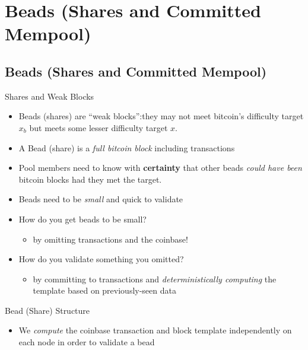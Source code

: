 \documentclass[tikz,mathserif,usenames,dvipsnames,svgnames,table]{beamer}
\newlength{\wideitemsep}
\let\olditem\item
\renewcommand{\item}{\setlength{\itemsep}{\wideitemsep}\olditem}
\begin{document}
\section{Beads (Shares and Committed Mempool)}
\subsection{Beads (Shares and Committed Mempool)}
\begin{frame}{Shares and Weak Blocks}
    \begin{itemize}
        \item Beads (shares) are ``weak blocks'':they may not meet bitcoin's difficulty target $x_b$
            but meets some lesser difficulty target $x$.
        \item A Bead (share) is a {\it full bitcoin block} including transactions
        \item Pool members need to know with {\bf certainty} that other beads {\it could have been}
            bitcoin blocks had they met the target.
        \item Beads need to be {\it small} and quick to validate
        \item How do you get beads to be small?
            \begin{itemize}
                \item[$\Rightarrow$] by omitting transactions and the coinbase!
            \end{itemize}
        \item How do you validate something you omitted?
            \begin{itemize}
                \item[$\Rightarrow$] by committing to transactions and {\it deterministically
                    computing} the template based on previously-seen data
            \end{itemize}
    \end{itemize}
\end{frame}
\begin{frame}{Bead (Share) Structure}



\begin{itemize}
    \item We {\it compute} the coinbase transaction and block template independently on each node
        in order to validate a bead
\end{itemize}
\end{frame}
\end{document}
